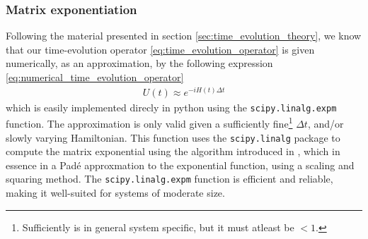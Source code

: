 \documentclass{subfiles}
\begin{document}
\subsubsection{Matrix exponentiation}
Following the material presented in section \ref{sec:time_evolution_theory}, we know that our time-evolution operator \eqref{eq:time_evolution_operator} is given numerically, as an approximation, by the following expression \eqref{eq:numerical_time_evolution_operator}
\begin{align*}
    U(t) \approx e^{-iH(t)\Delta t} 
\end{align*}
which is easily implemented direcly in python using the \texttt{scipy.linalg.expm} function. The approximation is only valid given a sufficiently fine\footnote{Sufficiently is in general system specific, but it must atleast be $<1$.} $\Delta t$, and/or slowly varying Hamiltonian. This function uses the \texttt{scipy.linalg} package to compute the matrix exponential using the algorithm introduced in \cite{Al-Mohy_Higham_2010}, which in essence in a Padé approxmation to the exponential function, using a scaling and squaring method. The \texttt{scipy.linalg.expm} function is efficient and reliable, making it well-suited for systems of moderate size. 
\end{document}
